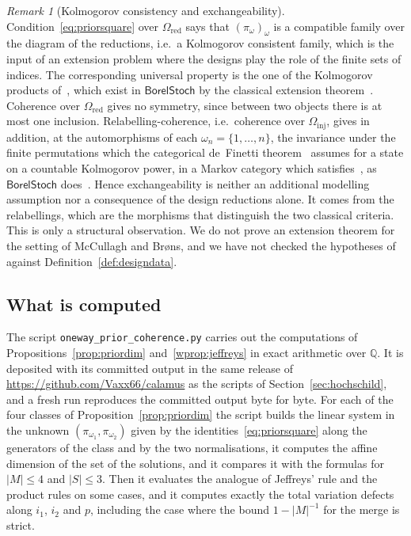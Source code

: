 \documentclass[11pt,a4paper]{article}
\theoremstyle{plain}
\theoremstyle{definition}
\theoremstyle{remark}
\newtheorem{remark}[theorem]{Remark}
\newcommand{\cat}[1]{\mathsf{#1}}
\newcommand{\catO}{\cat{\Omega}}
\newcommand{\BorelStoch}{\cat{BorelStoch}}
\begin{document}
\begin{remark}[Kolmogorov consistency and exchangeability]\label{rem:definetti}
Condition~\eqref{eq:priorsquare} over $\catO_{\mathrm{red}}$ says that
$(\pi_{\omega})_{\omega}$ is a compatible family over the diagram of the
reductions, i.e.\ a Kolmogorov consistent family, which is the input of an
extension problem where the designs play the role of the finite sets of
indices. The corresponding universal property is the one of the Kolmogorov
products of~\cite[Def.~3.1, Def.~4.1]{fritz_rischel_infinite_2020}, which
exist in $\BorelStoch$ by the classical extension
theorem~\cite[Ex.~3.6]{fritz_rischel_infinite_2020}. Coherence over
$\catO_{\mathrm{red}}$ gives no symmetry, since between two objects there is
at most one inclusion. Relabelling-coherence, i.e.\ coherence over
$\catO_{\mathrm{inj}}$, gives in addition, at the automorphisms of each
$\omega_n = \{1,\dots,n\}$, the invariance under the finite permutations which
the categorical de~Finetti
theorem~\cite[Thm.~4.4]{fritz_definetti_2021} assumes for a state on a
countable Kolmogorov power, in a Markov category which
satisfies~\cite[Assumption~4.2]{fritz_definetti_2021}, as $\BorelStoch$
does~\cite[Ex.~4.3]{fritz_definetti_2021}. Hence exchangeability is neither an
additional modelling assumption nor a consequence of the design reductions
alone. It comes from the relabellings, which are the morphisms that
distinguish the two classical criteria. This is only a structural observation.
We do not prove an extension theorem for the setting of McCullagh and Br\o ns,
and we have not checked the hypotheses
of~\cite{fritz_rischel_infinite_2020,fritz_definetti_2021} against
Definition~\ref{def:designdata}.
\end{remark}

\subsection*{What is computed}

The script \texttt{oneway\_\allowbreak prior\_\allowbreak coherence.py}
carries out the computations of Propositions~\ref{prop:priordim}
and~\ref{wprop:jeffreys} in exact arithmetic over $\mathbb{Q}$. It is
deposited with its committed output in the same release of
\url{https://github.com/Vaxx66/calamus} as the scripts of
Section~\ref{sec:hochschild}, and a fresh run reproduces the committed output
byte for byte. For each of the four classes of
Proposition~\ref{prop:priordim} the script builds the linear system in the
unknown $(\pi_{\omega_1},\pi_{\omega_2})$ given by the
identities~\eqref{eq:priorsquare} along the generators of the class and by the
two normalisations, it computes the affine dimension of the set of the
solutions, and it compares it with the formulas for $|M| \le 4$ and
$|S| \le 3$. Then it evaluates the analogue of Jeffreys' rule and the product
rules on some cases, and it computes exactly the total variation defects along
$i_{1}$, $i_{2}$ and $p$, including the case where the bound $1-|M|^{-1}$ for
the merge is strict.
\end{document}
